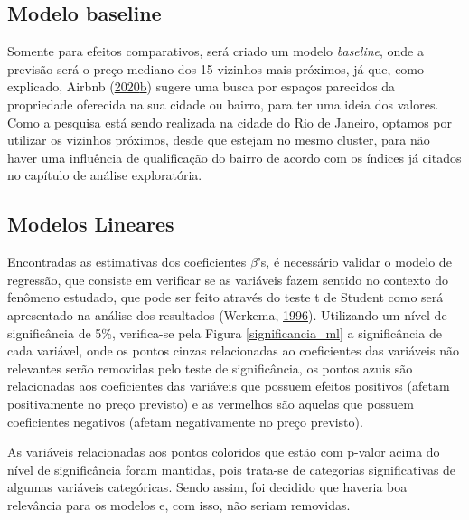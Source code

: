 \documentclass[
	12pt,				%
	a4paper,		%
	oneside,    %
	chapter=TITLE,		   %
	section=TITLE,		   %
	subsection=TITLE,	   %
	subsubsection=TITLE, %
	english,			%
	french,				%
	spanish,			%
	brazil,				%
]{abntex2}
\begin{document}
\hypertarget{modelo-baseline}{%
\subsection{Modelo baseline}\label{modelo-baseline}}

Somente para efeitos comparativos, será criado um modelo
\emph{baseline}, onde a previsão será o preço mediano dos 15 vizinhos
mais próximos, já que, como explicado, Airbnb
(\protect\hyperlink{ref-precoairbnb}{2020}\protect\hyperlink{ref-precoairbnb}{b})
sugere uma busca por espaços parecidos da propriedade oferecida na sua
cidade ou bairro, para ter uma ideia dos valores. Como a pesquisa está
sendo realizada na cidade do Rio de Janeiro, optamos por utilizar os
vizinhos próximos, desde que estejam no mesmo cluster, para não haver
uma influência de qualificação do bairro de acordo com os índices já
citados no capítulo de análise exploratória.

\hypertarget{modelos-lineares}{%
\subsection{Modelos Lineares}\label{modelos-lineares}}

Encontradas as estimativas dos coeficientes \(\beta\)'s, é necessário
validar o modelo de regressão, que consiste em verificar se as variáveis
fazem sentido no contexto do fenômeno estudado, que pode ser feito
através do teste t de Student como será apresentado na análise dos
resultados (Werkema, \protect\hyperlink{ref-werkema1996analise}{1996}).
Utilizando um nível de significância de 5\%, verifica-se pela Figura
\ref{significancia_ml} a significância de cada variável, onde os pontos
cinzas relacionadas ao coeficientes das variáveis não relevantes serão
removidas pelo teste de significância, os pontos azuis são relacionadas
aos coeficientes das variáveis que possuem efeitos positivos (afetam
positivamente no preço previsto) e as vermelhos são aquelas que possuem
coeficientes negativos (afetam negativamente no preço previsto).

As variáveis relacionadas aos pontos coloridos que estão com p-valor
acima do nível de significância foram mantidas, pois trata-se de
categorias significativas de algumas variáveis categóricas. Sendo assim,
foi decidido que haveria boa relevância para os modelos e, com isso, não
seriam removidas.
\end{document}
